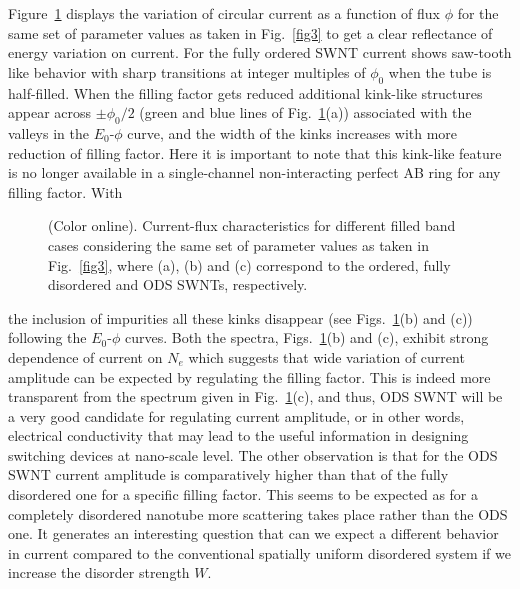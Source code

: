 \documentclass[prb,aps,twocolumn,amsmath,amssymb,floatfix,
superscriptaddress]{revtex4}
\begin{document}
Figure~\ref{fig4} displays the variation of circular current as a function of
flux $\phi$ for the same set of parameter values as taken in Fig.~\ref{fig3}
to get a clear reflectance of energy variation on current. For the fully ordered
SWNT current shows saw-tooth like behavior with sharp transitions at integer
multiples of $\phi_0$ when the tube is half-filled. When the filling factor gets
reduced additional kink-like structures appear across $\pm \phi_0/2$ (green and
blue lines of Fig.~\ref{fig4}(a)) associated with the valleys in the $E_0$-$\phi$ 
curve, and the width of the kinks increases with more reduction of filling factor. 
Here it is important to note that this kink-like feature is no longer available 
in a single-channel non-interacting perfect AB ring for any filling factor. With
\begin{figure}[ht]
{\centering {}\par}
\caption{(Color online). Current-flux characteristics for different filled
band cases considering the same set of parameter values as taken in 
Fig.~\ref{fig3}, where (a), (b) and (c) correspond to the ordered, 
fully disordered and ODS SWNTs, respectively.} 
\label{fig4}
\end{figure}
the inclusion of impurities all these kinks disappear (see Figs.~\ref{fig4}(b)
and (c)) following the $E_0$-$\phi$ curves. Both the spectra, Figs.~\ref{fig4}(b)
and (c), exhibit strong dependence of current on $N_e$ which suggests that wide
variation of current amplitude can be expected by regulating the filling factor.
This is indeed more transparent from the spectrum given in Fig.~\ref{fig4}(c),
and thus, ODS SWNT will be a very good candidate for regulating current 
amplitude, or in other words, electrical conductivity that may lead to the 
useful information in designing switching devices at nano-scale level. The 
other observation is that for the ODS SWNT current amplitude is 
comparatively higher than that of the fully disordered one for a specific 
filling factor. This seems to be expected as for a completely disordered 
nanotube more scattering takes place rather than the ODS one. 
It generates an interesting question that can we expect a different behavior
in current compared to the conventional spatially uniform disordered system if
we increase the disorder strength $W$. 
\end{document}
